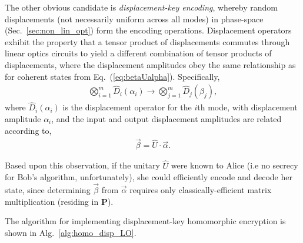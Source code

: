 \documentclass[aps,rmp,twocolumn,amsmath,amssymb,nofootinbib,superscriptaddress,longbibliography,floatfix,table-of-contents,eqsecnum]{revtex4-1}
\begin{document}
The other obvious candidate is \textit{displacement-key encoding}, whereby random displacements (not necessarily uniform across all modes) in phase-space (Sec.~\ref{sec:non_lin_opt}) form the encoding operations. Displacement operators exhibit the property that a tensor product of displacements commutes through linear optics circuits to yield a different combination of tensor products of displacements, where the displacement amplitudes obey the same relationship as for coherent states from Eq.~(\ref{eq:betaUalpha}). Specifically,
\begin{align}
\bigotimes_{i=1}^m \hat{D}_i(\alpha_i) \to \bigotimes_{j=1}^m \hat{D}_j(\beta_j),
\end{align}
where $\hat{D}_i(\alpha_i)$ is the displacement operator for the $i$th mode, with displacement amplitude $\alpha_i$, and the input and output displacement amplitudes are related according to,
\begin{align}
\vec\beta = \hat{U}\cdot\vec\alpha.
\end{align}

Based upon this observation, if the unitary $\hat{U}$ were known to Alice (i.e no secrecy for Bob's algorithm, unfortunately), she could efficiently encode and decode her state, since determining $\vec\beta$ from $\vec\alpha$ requires only classically-efficient matrix multiplication (residing in \textbf{P}).

The algorithm for implementing displacement-key homomorphic encryption is shown in Alg.~\ref{alg:homo_disp_LO}.
\end{document}
